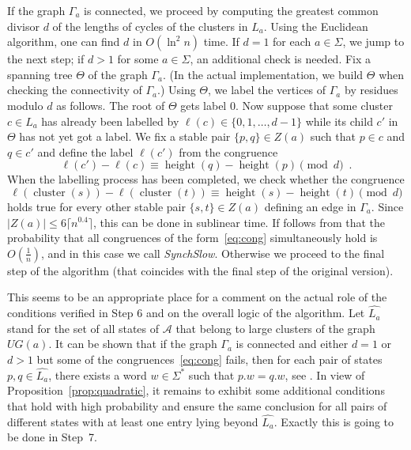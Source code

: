 \documentclass{llncs}
\DeclareMathOperator{\height}{height}
\DeclareMathOperator{\cluster}{cluster}
\begin{document}
If the graph $\Gamma_a$ is connected, we proceed by computing the greatest common divisor $d$ of the lengths of cycles of the clusters in $L_a$. Using the Euclidean algorithm, one can find $d$ in $O(\ln^2n)$ time. If $d=1$ for each $a\in\Sigma$, we jump to the next step; if $d>1$ for some $a\in\Sigma$, an additional check is needed. Fix a spanning tree $\Theta$ of the graph $\Gamma_a$. (In the actual implementation, we build $\Theta$ when checking the connectivity of $\Gamma_a$.) Using $\Theta$, we label the vertices of $\Gamma_a$ by residues modulo $d$ as follows. The root of $\Theta$ gets label 0. Now suppose that some cluster $c\in L_a$ has already been labelled by $\ell(c)\in\{0,1,\dots,d-1\}$ while its child $c'$ in $\Theta$ has not yet got a label. We fix a stable pair $\{p,q\}\in Z(a)$ such that $p \in c$ and $q\in c'$ and define the label $\ell(c')$ from the congruence
\[
\ell(c')-\ell(c)\equiv \height(q) - \height(p)\pmod{d}\enspace.
\]
When the labelling process has been completed, we check whether the congruence
\begin{equation}
\label{eq:cong}
\ell(\cluster(s))-\ell(\cluster(t))\equiv \height(s) - \height(t)\pmod{d}
\end{equation}
holds true for every other stable pair $\{s,t\}\in Z(a)$ defining an edge in $\Gamma_a$. Since $|Z(a)|\le 6\lceil n^{0.4}\rceil$, this can be done in sublinear time. If follows from \cite[Lemma~4]{Berlinkov:preprint} that the probability that all congruences of the form~\eqref{eq:cong} simultaneously hold is $O(\frac1n)$, and in this case we call \emph{SynchSlow}. Otherwise we proceed
to the final step of the algorithm (that coincides with the final step of the original version).

\begin{remark}
\label{rem:logic}
This seems to be an appropriate place for a comment on the actual role of the conditions verified in Step 6 and on the overall logic of the algorithm. Let $\widehat{L_a}$ stand for the set of all states of $\mathcal{A}$ that belong to large clusters of the graph $U\!G(a)$.  It can be shown that if the graph $\Gamma_a$ is connected and either $d=1$ or $d>1$ but some of the congruences~\eqref{eq:cong} fails, then for each pair of states $p,q\in\widehat{L_a}$, there exists a word $w\in\Sigma^*$ such that $p.w = q.w$, see \cite[Lemmas~3 and~4]{Berlinkov:preprint}. In view of Proposition~\ref{prop:quadratic}, it remains to exhibit some additional conditions that hold with high probability and ensure the same conclusion for all pairs of different states with at least one entry lying beyond $\widehat{L_a}$. Exactly this is going to be done in Step~7.
\end{remark}
\end{document}
